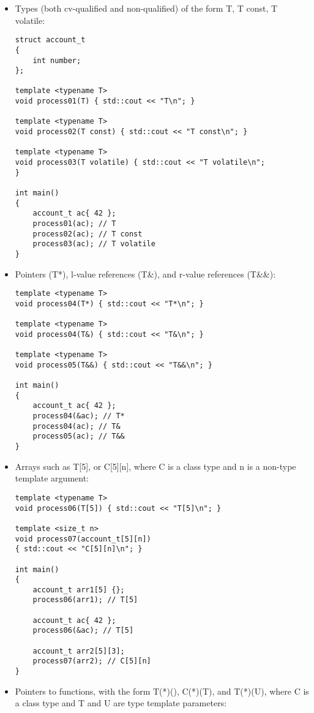 \begin{itemize}
\item
Types (both cv-qualified and non-qualified) of the form T, T const, T volatile:

\begin{lstlisting}[style=styleCXX]
struct account_t
{
	int number;
};

template <typename T>
void process01(T) { std::cout << "T\n"; }

template <typename T>
void process02(T const) { std::cout << "T const\n"; }

template <typename T>
void process03(T volatile) { std::cout << "T volatile\n";
}

int main()
{
	account_t ac{ 42 };
	process01(ac); // T
	process02(ac); // T const
	process03(ac); // T volatile
}
\end{lstlisting}

\item
Pointers (T*), l-value references (T\&), and r-value references (T\&\&):

\begin{lstlisting}[style=styleCXX]
template <typename T>
void process04(T*) { std::cout << "T*\n"; }

template <typename T>
void process04(T&) { std::cout << "T&\n"; }

template <typename T>
void process05(T&&) { std::cout << "T&&\n"; }

int main()
{
	account_t ac{ 42 };
	process04(&ac); // T*
	process04(ac); // T&
	process05(ac); // T&&
}
\end{lstlisting}

\item
Arrays such as T[5], or C[5][n], where C is a class type and n is a non-type template argument:

\begin{lstlisting}[style=styleCXX]
template <typename T>
void process06(T[5]) { std::cout << "T[5]\n"; }

template <size_t n>
void process07(account_t[5][n])
{ std::cout << "C[5][n]\n"; }

int main()
{
	account_t arr1[5] {};
	process06(arr1); // T[5]
	
	account_t ac{ 42 };
	process06(&ac); // T[5]
	
	account_t arr2[5][3];
	process07(arr2); // C[5][n]
}
\end{lstlisting}

\item
Pointers to functions, with the form T(*)(), C(*)(T), and T(*)(U), where C is a class type and T and U are type template parameters:


\end{itemize}
